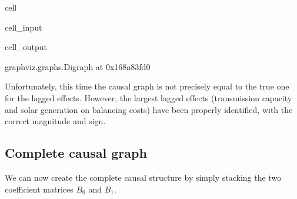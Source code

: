 \documentclass[letterpaper,10pt,english]{jupyterBook}
\begin{document}
\begin{sphinxuseclass}{cell}\begin{sphinxVerbatimInput}

\begin{sphinxuseclass}{cell_input}
\begin{sphinxVerbatim}[commandchars=\\\{\}]
  
\PYG{p}{[}\PYG{p}{]}  
\end{sphinxVerbatim}

\end{sphinxuseclass}\end{sphinxVerbatimInput}
\begin{sphinxVerbatimOutput}

\begin{sphinxuseclass}{cell_output}
\begin{sphinxVerbatim}[commandchars=\\\{\}]
\PYGZlt{}graphviz.graphs.Digraph at 0x168a83fd0\PYGZgt{}
\end{sphinxVerbatim}

\end{sphinxuseclass}\end{sphinxVerbatimOutput}

\end{sphinxuseclass}
\sphinxAtStartPar
Unfortunately, this time the causal graph is not precisely equal to the true one for the lagged effects. However, the largest lagged effects (transmission capacity and solar generation on balancing costs) have been properly identified, with the correct magnitude and sign.


\subsection{Complete causal graph}
\label{\detokenize{notebooks/semiparametric_varlingam:complete-causal-graph}}
\sphinxAtStartPar
We can now create the complete causal structure by simply stacking the two coefficient matrices \(B_0\) and \(B_1\).
\end{document}
